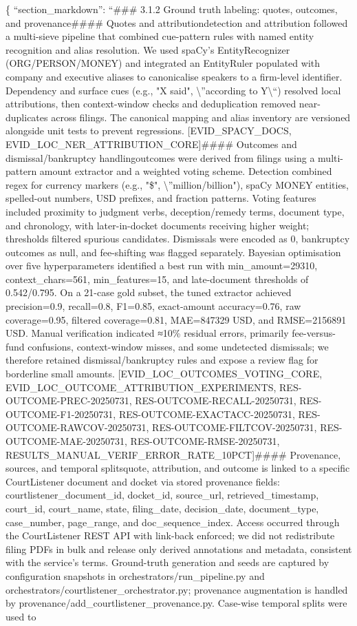 \{
``section\_markdown'': ``\#\#\# 3.1.2 Ground truth labeling: quotes, outcomes, and provenance\n\n\#\#\#\# Quotes and attribution\nQuote detection and attribution followed a multi-sieve pipeline that combined cue-pattern rules with named entity recognition and alias resolution. We used spaCy's EntityRecognizer (ORG/PERSON/MONEY) and integrated an EntityRuler populated with company and executive aliases to canonicalise speakers to a firm-level identifier. Dependency and surface cues (e.g., "X said", \textbackslash{}''according to Y\textbackslash{}``) resolved local attributions, then context-window checks and deduplication removed near-duplicates across filings. The canonical mapping and alias inventory are versioned alongside unit tests to prevent regressions. {[}EVID\_SPACY\_DOCS, EVID\_LOC\_NER\_ATTRIBUTION\_CORE{]}\n\n\#\#\#\# Outcomes and dismissal/bankruptcy handling\nCase outcomes were derived from filings using a multi-pattern amount extractor and a weighted voting scheme. Detection combined regex for currency markers (e.g., "\$", \textbackslash{}''million/billion"), spaCy MONEY entities, spelled-out numbers, USD prefixes, and fraction patterns. Voting features included proximity to judgment verbs, deception/remedy terms, document type, and chronology, with later-in-docket documents receiving higher weight; thresholds filtered spurious candidates. Dismissals were encoded as 0, bankruptcy outcomes as null, and fee-shifting was flagged separately. Bayesian optimisation over five hyperparameters identified a best run with min\_amount=29310, context\_chars=561, min\_features=15, and late-document thresholds of 0.542/0.795. On a 21-case gold subset, the tuned extractor achieved precision=0.9, recall=0.8, F1=0.85, exact-amount accuracy=0.76, raw coverage=0.95, filtered coverage=0.81, MAE=847329 USD, and RMSE=2156891 USD. Manual verification indicated ≈10\% residual errors, primarily fee-versus-fund confusions, context-window misses, and some undetected dismissals; we therefore retained dismissal/bankruptcy rules and expose a review flag for borderline small amounts. {[}EVID\_LOC\_OUTCOMES\_VOTING\_CORE, EVID\_LOC\_OUTCOME\_ATTRIBUTION\_EXPERIMENTS, RES-OUTCOME-PREC-20250731, RES-OUTCOME-RECALL-20250731, RES-OUTCOME-F1-20250731, RES-OUTCOME-EXACTACC-20250731, RES-OUTCOME-RAWCOV-20250731, RES-OUTCOME-FILTCOV-20250731, RES-OUTCOME-MAE-20250731, RES-OUTCOME-RMSE-20250731, RESULTS\_MANUAL\_VERIF\_ERROR\_RATE\_10PCT{]}\n\n\#\#\#\# Provenance, sources, and temporal splits\nEvery quote, attribution, and outcome is linked to a specific CourtListener document and docket via stored provenance fields: courtlistener\_document\_id, docket\_id, source\_url, retrieved\_timestamp, court\_id, court\_name, state, filing\_date, decision\_date, document\_type, case\_number, page\_range, and doc\_sequence\_index. Access occurred through the CourtListener REST API with link-back enforced; we did not redistribute filing PDFs in bulk and release only derived annotations and metadata, consistent with the service's terms. Ground-truth generation and seeds are captured by configuration snapshots in orchestrators/run\_pipeline.py and orchestrators/courtlistener\_orchestrator.py; provenance augmentation is handled by provenance/add\_courtlistener\_provenance.py. Case-wise temporal splits were used to 